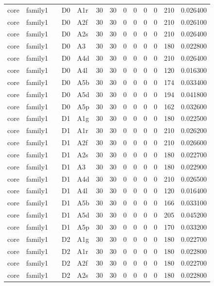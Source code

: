 \begin{tabular}{lllllrrrrrrrr}
core & family1 &  & D0 & A1r & 30 & 30 & 0 & 0 & 0 & 0 & 210 & 0.026400 \\
core & family1 &  & D0 & A2f & 30 & 30 & 0 & 0 & 0 & 0 & 210 & 0.026100 \\
core & family1 &  & D0 & A2s & 30 & 30 & 0 & 0 & 0 & 0 & 210 & 0.026400 \\
core & family1 &  & D0 & A3 & 30 & 30 & 0 & 0 & 0 & 0 & 180 & 0.022800 \\
core & family1 &  & D0 & A4d & 30 & 30 & 0 & 0 & 0 & 0 & 210 & 0.026400 \\
core & family1 &  & D0 & A4l & 30 & 30 & 0 & 0 & 0 & 0 & 120 & 0.016300 \\
core & family1 &  & D0 & A5b & 30 & 30 & 0 & 0 & 0 & 0 & 174 & 0.033400 \\
core & family1 &  & D0 & A5d & 30 & 30 & 0 & 0 & 0 & 0 & 194 & 0.041800 \\
core & family1 &  & D0 & A5p & 30 & 30 & 0 & 0 & 0 & 0 & 162 & 0.032600 \\
core & family1 &  & D1 & A1g & 30 & 30 & 0 & 0 & 0 & 0 & 180 & 0.022500 \\
core & family1 &  & D1 & A1r & 30 & 30 & 0 & 0 & 0 & 0 & 210 & 0.026200 \\
core & family1 &  & D1 & A2f & 30 & 30 & 0 & 0 & 0 & 0 & 210 & 0.026600 \\
core & family1 &  & D1 & A2s & 30 & 30 & 0 & 0 & 0 & 0 & 180 & 0.022700 \\
core & family1 &  & D1 & A3 & 30 & 30 & 0 & 0 & 0 & 0 & 180 & 0.022900 \\
core & family1 &  & D1 & A4d & 30 & 30 & 0 & 0 & 0 & 0 & 210 & 0.026500 \\
core & family1 &  & D1 & A4l & 30 & 30 & 0 & 0 & 0 & 0 & 120 & 0.016400 \\
core & family1 &  & D1 & A5b & 30 & 30 & 0 & 0 & 0 & 0 & 166 & 0.033100 \\
core & family1 &  & D1 & A5d & 30 & 30 & 0 & 0 & 0 & 0 & 205 & 0.045200 \\
core & family1 &  & D1 & A5p & 30 & 30 & 0 & 0 & 0 & 0 & 170 & 0.033200 \\
core & family1 &  & D2 & A1g & 30 & 30 & 0 & 0 & 0 & 0 & 180 & 0.022700 \\
core & family1 &  & D2 & A1r & 30 & 30 & 0 & 0 & 0 & 0 & 180 & 0.022800 \\
core & family1 &  & D2 & A2f & 30 & 30 & 0 & 0 & 0 & 0 & 180 & 0.022700 \\
core & family1 &  & D2 & A2s & 30 & 30 & 0 & 0 & 0 & 0 & 180 & 0.022800 \\

\end{tabular}

